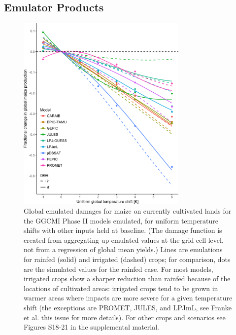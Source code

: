 \documentclass[gmd, manuscript]{copernicus} %
\begin{document}
\subsection{Emulator Products}
\label{S:4}
\begin{figure}[ht]
    \centering
    \includegraphics[width=8.3cm]{figures/global_em_maize.png}
    \caption{Global emulated damages for maize on currently cultivated lands for the GGCMI Phase II models emulated, for uniform temperature shifts with other inputs held at baseline. 
    (The damage function is created from aggregating up emulated values at the grid cell level, not from a regression of global mean yields.) 
    Lines are emulations for rainfed (solid) and irrigated (dashed) crops; for comparison, dots are the simulated values for the rainfed case.  
    For most models, irrigated crops show a sharper reduction than rainfed because of the locations of cultivated areas: irrigated crops tend to be grown in warmer areas where impacts are more severe for a given temperature shift (the exceptions are PROMET, JULES, and LPJmL, see Franke et al. this issue for more details). 
    For other crops and scenarios see Figures S18-21 in the supplemental material.}
    \label{fig:globe_em}
\end{figure}
\end{document}

